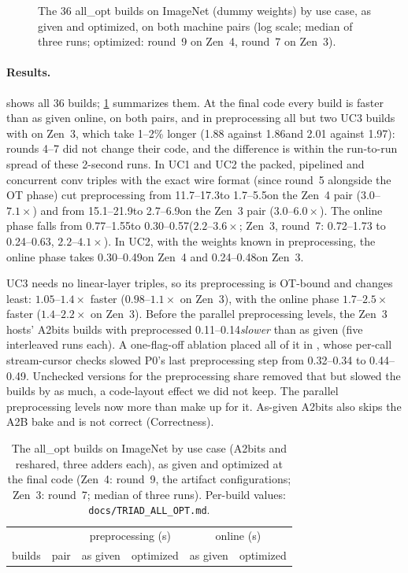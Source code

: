\begin{figure}[t]
  \centering
  \caption{The 36 all\_opt builds on ImageNet (dummy weights) by use case, as given and optimized, on both machine pairs
  (log scale; median of three runs; optimized: round~9 on Zen~4, round~7 on Zen~3).}
  \label{fig:triad}
\end{figure}

\paragraph{Results.}  shows all 36 builds; \cref{tab:triad} summarizes them. At the final code every
build is faster than as given online, on both pairs, and in preprocessing all but two UC3 builds with
 on Zen~3, which take 1--2\% longer (1.88 against 1.86\s and 2.01 against 1.97\s): rounds 4--7 did not
change their code, and the difference is within the run-to-run spread of these 2-second runs. In UC1 and UC2 the packed, pipelined and concurrent
conv triples with the exact wire format (since round~5 alongside the OT phase) cut preprocessing from 11.7--17.3\s to 1.7--5.5\s on the Zen~4 pair ($3.0$--$7.1\times$) and from
15.1--21.9\s to 2.7--6.9\s on the Zen~3 pair ($3.0$--$6.0\times$). The online phase falls from 0.77--1.55\s to
0.30--0.57\s ($2.2$--$3.6\times$; Zen~3, round~7: 0.72--1.73 to 0.24--0.63\s, $2.2$--$4.1\times$). In UC2, with the weights
known in preprocessing, the online phase takes 0.30--0.49\s on Zen~4 and 0.24--0.48\s on Zen~3.

UC3 needs no linear-layer triples, so its preprocessing is OT-bound and changes least: $1.05$--$1.4\times$ faster
($0.98$--$1.1\times$ on Zen~3), with the online phase $1.7$--$2.5\times$ faster ($1.4$--$2.2\times$ on Zen~3). Before the parallel
preprocessing levels, the Zen~3 hosts' A2bits builds with  preprocessed 0.11--0.14\s \emph{slower} than
as given (five interleaved runs each). A one-flag-off ablation placed all of it in , whose
per-call stream-cursor checks slowed P0's last preprocessing step from 0.32--0.34 to 0.44--0.49\s. Unchecked versions
for the preprocessing share removed that but slowed the  builds by as much, a code-layout effect we
did not keep. The parallel preprocessing levels now more than make up for it. As-given A2bits also skips the A2B bake and is not correct (Correctness).

\begin{table}[t]
\centering\small
\begin{tabular}{@{}llrrrr@{}}
\toprule
& & \multicolumn{2}{c}{preprocessing (s)} & \multicolumn{2}{c}{online (s)}\\
builds & pair & as given & optimized & as given & optimized\\
\midrule

\end{tabular}
\caption{The all\_opt builds on ImageNet by use case (A2bits and reshared, three adders each), as given and optimized
at the final code (Zen~4: round~9, the artifact configurations; Zen~3: round~7; median of three runs). Per-build values:
\texttt{docs/TRIAD\_ALL\_OPT.md}.}
\label{tab:triad}
\end{table}

